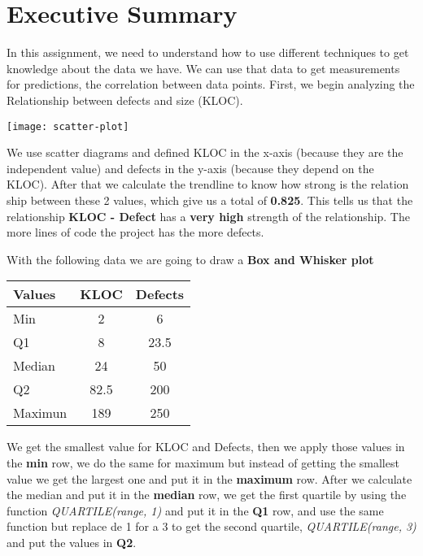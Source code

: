 \section{Executive Summary}
In this assignment, we need to understand how to use different techniques to get knowledge about the data we have. We can use that data to get measurements for predictions, the correlation between data points.
\newline\newline
\noindent
First, we begin analyzing the Relationship between defects and size (KLOC). 
\begin{center}
    \texttt{[image: scatter-plot]}    
\end{center}

\noindent
We use scatter diagrams and defined KLOC in the x-axis (because they are the independent value) and defects in the y-axis (because they depend on the KLOC).
\newline\newline
\noindent
After that we calculate the trendline to know how strong is the relation ship between these 2 values, which give us a total of \textbf{0.825}.
\newline\newline
\noindent
This tells us that the relationship \textbf{KLOC - Defect} has a \textbf{very high} strength of the relationship. The more lines of code the project has the more defects.

\pagebreak
\noindent
With the following data we are going to draw a \textbf{Box and Whisker plot}

\begin{center}
    \begin{tabular}{|p{2.5cm} | c | c|}
        \hline
        Values & \textbf{KLOC} & \textbf{Defects} \\ [0.5ex] 
        \hline
        Min & 2 & 6 \\  
        \hline
        Q1 & 8 & 23.5    \\
        \hline
        Median & 24 & 50 \\
        \hline
        Q2 & 82.5 & 200  \\  
        \hline
        Maximun & 189 & 250 \\
        \hline
    \end{tabular}
\end{center}

\noindent

We get the smallest value for KLOC and Defects, then we apply those values in the \textbf{min} row, we do the same for maximum but instead of getting the smallest value we get the largest one and put it in the \textbf{maximum} row.
\newline\newline
\noindent
After we calculate the median and put it in the \textbf{median} row, we get the first quartile by using the function \textit{QUARTILE(range, 1)} and put it in the \textbf{Q1} row, and use the same function but replace de 1 for a 3 to get the second quartile, \textit{QUARTILE(range, 3)} and put the values in \textbf{Q2}.

